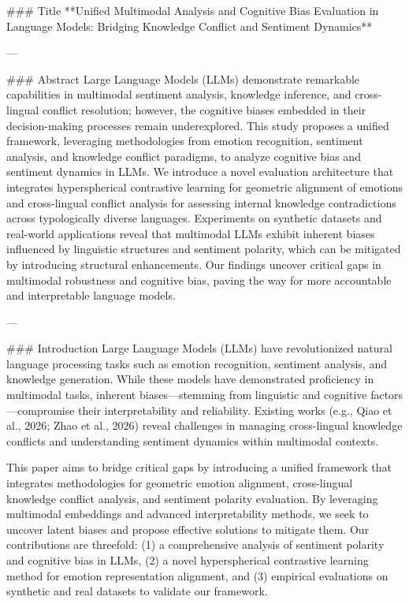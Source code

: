 ### Title
**Unified Multimodal Analysis and Cognitive Bias Evaluation in Language Models: Bridging Knowledge Conflict and Sentiment Dynamics**

---

### Abstract
Large Language Models (LLMs) demonstrate remarkable capabilities in multimodal sentiment analysis, knowledge inference, and cross-lingual conflict resolution; however, the cognitive biases embedded in their decision-making processes remain underexplored. This study proposes a unified framework, leveraging methodologies from emotion recognition, sentiment analysis, and knowledge conflict paradigms, to analyze cognitive bias and sentiment dynamics in LLMs. We introduce a novel evaluation architecture that integrates hyperspherical contrastive learning for geometric alignment of emotions and cross-lingual conflict analysis for assessing internal knowledge contradictions across typologically diverse languages. Experiments on synthetic datasets and real-world applications reveal that multimodal LLMs exhibit inherent biases influenced by linguistic structures and sentiment polarity, which can be mitigated by introducing structural enhancements. Our findings uncover critical gaps in multimodal robustness and cognitive bias, paving the way for more accountable and interpretable language models.

---

### Introduction
Large Language Models (LLMs) have revolutionized natural language processing tasks such as emotion recognition, sentiment analysis, and knowledge generation. While these models have demonstrated proficiency in multimodal tasks, inherent biases—stemming from linguistic and cognitive factors—compromise their interpretability and reliability. Existing works (e.g., Qiao et al., 2026; Zhao et al., 2026) reveal challenges in managing cross-lingual knowledge conflicts and understanding sentiment dynamics within multimodal contexts.

This paper aims to bridge critical gaps by introducing a unified framework that integrates methodologies for geometric emotion alignment, cross-lingual knowledge conflict analysis, and sentiment polarity evaluation. By leveraging multimodal embeddings and advanced interpretability methods, we seek to uncover latent biases and propose effective solutions to mitigate them. Our contributions are threefold: (1) a comprehensive analysis of sentiment polarity and cognitive bias in LLMs, (2) a novel hyperspherical contrastive learning method for emotion representation alignment, and (3) empirical evaluations on synthetic and real datasets to validate our framework.

